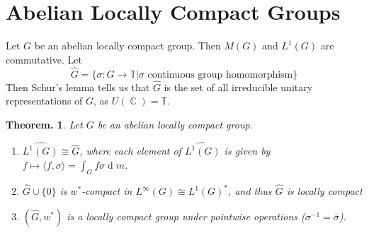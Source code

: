 \documentclass[11pt, a4paper]{memoir}
\DeclareMathOperator{\C}{{\mathbb{C}}}
\theoremstyle{change}
\newtheorem{theorem}{Theorem.}[section]
\theoremstyle{plain}
\theoremstyle{nonumberplain}
\renewcommand{\d}[1]{\ensuremath{\operatorname{d}\!{#1}}}
\numberwithin{equation}{section}
\begin{document}
\section{Abelian Locally Compact Groups}
Let $G$ be an abelian locally compact group.
Then $M(G)$ and $L^1(G)$ are commutative.
Let
\begin{equation*}
    \widehat{G} = \{\sigma:G\to\mathbb{T}|\sigma\text{ continuous group homomorphism}\}
\end{equation*}
Then Schur's lemma tells us that $\widehat{G}$ is the set of all irreducible unitary representations of $G$, as $U(\C)=\mathbb{T}$.
\begin{theorem}
    Let $G$ be an abelian locally compact group.
    \begin{enumerate}[nl,r]
        \item $\widehat{L^1(G)}\cong\widehat{G}$, where each element of $\widehat{L^1(G)}$ is given by $f\mapsto\langle f,\sigma\rangle=\int_G f\sigma\d{m}$.
        \item $\widehat{G}\cup\{0\}$ is $w^*$-compact in $L^\infty(G)\cong L^1(G)^*$, and thus $\widehat{G}$ is locally compact
        \item $(\widehat{G},w^*)$ is a locally compact group under pointwise operations ($\sigma^{-1}=\overline{\sigma}$).
    \end{enumerate}
\end{theorem}
\end{document}
